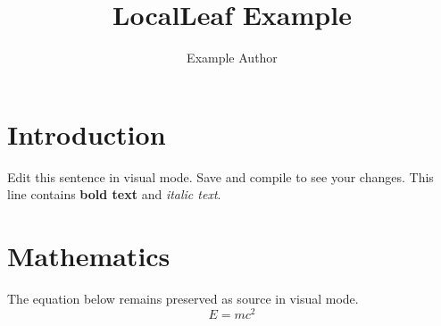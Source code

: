 \documentclass{article}
\title{LocalLeaf Example}
\author{Example Author}
\begin{document}
\maketitle
\section{Introduction}
Edit this sentence in visual mode. Save and compile to see your changes.
This line contains \textbf{bold text} and \textit{italic text}.
\section{Mathematics}
The equation below remains preserved as source in visual mode.
\begin{equation}
E = mc^2
\end{equation}
\end{document}

